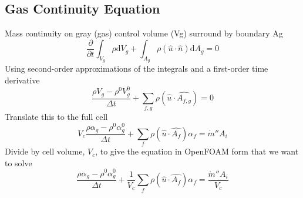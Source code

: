 \documentclass{article}
\renewcommand{\vec}[1]{\ensuremath{\hat{#1}}}
\renewcommand{\d}{\mathrm{d}}
\begin{document}
  \subsection{Gas Continuity Equation}
    Mass continuity on gray (gas) control volume (Vg) surround by boundary Ag
    \begin{equation*}
        \frac{\partial}{\partial t}\int_{V_g} \rho \d V_g 
      + \int_{A_g} \rho (\vec{u} \cdot \vec{n}) \d A_g
      = 0
    \end{equation*}
    Using second-order approximations of the integrals and a first-order time derivative
    \begin{equation*}
        \frac{\rho V_g - \rho^0 V_g^0}{\Delta t}
      + \sum_{f,g}\rho(\vec{u}\cdot\vec{A_{f,g}})
      = 0
    \end{equation*}
    Translate this to the full cell
    \begin{equation*}
        V_c\frac{\rho \alpha_g - \rho^0 \alpha_g^0}{\Delta t}
      + \sum_{f}\rho(\vec{u}\cdot\vec{A_{f}})\alpha_f
      = \dot{m}'' A_i
    \end{equation*}
    Divide by cell volume, $V_c$, to give the equation in OpenFOAM form that we want to solve
    \begin{equation}
      \label{eq:gasCont}
      \boxed{
        \frac{\rho \alpha_g - \rho^0 \alpha_g^0}{\Delta t}
      + \frac{1}{V_c}\sum_{f}\rho (\vec{u}\cdot\vec{A_{f}})\alpha_f
      = \frac{\dot{m}'' A_i}{V_c}
      }
    \end{equation}
\end{document}
